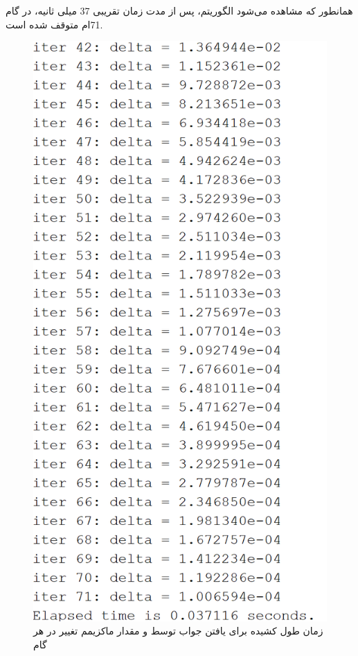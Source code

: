 همانطور که مشاهده می‌شود الگوریتم، پس از مدت زمان تقریبی 37 میلی ثانیه، در گام 71ام متوقف شده است.

\begin{figure}[!h]
	\centering
	\includegraphics[scale=0.4]{Images/example-iter.png}
	\caption{زمان طول کشیده برای یافتن جواب توسط  و مقدار ماکزیمم تغییر در هر گام}
\end{figure}

